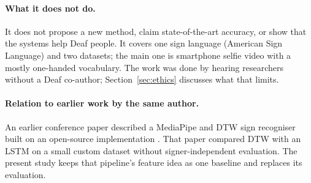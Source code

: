 \paragraph{What it does not do.} It does not propose a new method, claim state-of-the-art accuracy, or show that the
systems help Deaf people. It covers one sign language (American Sign Language) and two datasets; the main one is smartphone selfie video with a
mostly one-handed vocabulary. The work was done by hearing researchers without a Deaf co-author; Section~\ref{sec:ethics}
discusses what that limits.

\paragraph{Relation to earlier work by the same author.}
An earlier conference paper \citep{mankar2024} described a MediaPipe and DTW sign recogniser built on an open-source
implementation \citep{guerin2022signdtw}. That paper compared DTW with an LSTM on a small custom dataset without
signer-independent evaluation. The present study keeps that pipeline's feature idea as one baseline and replaces its
evaluation.
